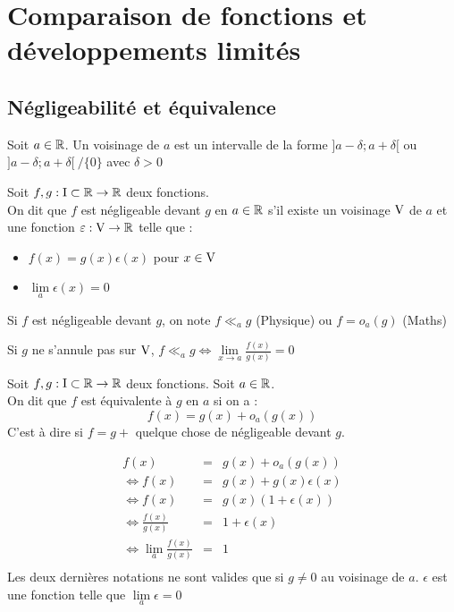 \chapter{Comparaison de fonctions et développements limités}
\section{Négligeabilité  et équivalence}

\begin{defi}
Soit $a\in\mathbb{R}$. Un voisinage de $a$ est un intervalle de la forme $]a-\delta;a+\delta[$ ou $]a-\delta;a+\delta[~/\{0\}$ avec $\delta>0$
\end{defi}

\begin{defi}[Négligeabilité]
Soit $f,g:\text{I}\subset\mathbb{R} \to \mathbb{R}$ deux fonctions.\\
On dit que $f$ est négligeable devant $g$ en $a\in\mathbb{R}$ s'il existe un voisinage $\text{V}$ de $a$ et une fonction $\varepsilon:\text{V}\to\mathbb{R}$ telle que :
\begin{itemize}
	\item $f(x) = g(x)\epsilon (x)$ pour $x\in \text{V}$
	\item $\lim\limits_{a}\epsilon(x)=0$
\end{itemize}
\end{defi}

\begin{nota}
Si $f$ est négligeable devant $g$, on note $f \ll_{a}g$ (Physique) ou $f=o_a(g)$ (Maths)
\end{nota}
\begin{rem}
Si $g$ ne s'annule pas sur $\text{V}$, $f \ll_a g \Leftrightarrow \lim\limits_{x\to a}\frac{f(x)}{g(x)}=0$
\end{rem}
\begin{expl}
\end{expl}

\begin{defi}[Équivalence]
Soit $f,g:\text{I}\subset\mathbb{R} \to \mathbb{R}$ deux fonctions. Soit $a\in\mathbb{R}$.\\
On dit que $f$ est équivalente à $g$ en $a$ si on a :
$$f(x) = g(x) + o_a(g(x))$$
C'est à dire si $f=g+$ quelque chose de négligeable devant $g$.
\end{defi}
\begin{rem}
\begin{eqnarray*}
		f(x) &=& g(x) + o_a(g(x))\\
		\Leftrightarrow f(x) & = & g(x) + g(x)\epsilon(x)\\
		\Leftrightarrow f(x) & = & g(x)(1+\epsilon(x))\\
		\Leftrightarrow \frac{f(x)}{g(x)} &=& 1 + \epsilon(x)\\
		\Leftrightarrow \lim\limits_a\frac{f(x)}{g(x)} &=& 1\\
\end{eqnarray*}
Les deux dernières notations ne sont valides que si $g\neq 0$ au voisinage de $a$. $\epsilon$ est une fonction telle que $\lim\limits_a\epsilon=0$ 
\end{rem}

